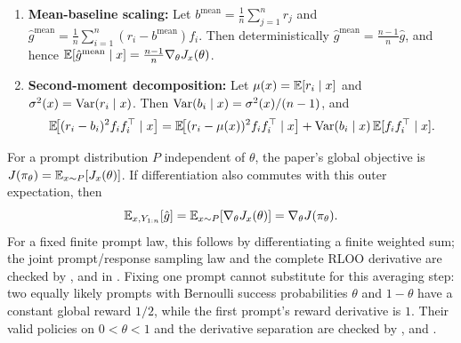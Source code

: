 \begin{remark}
\begin{enumerate}
    $\Cov(f_i, b_i\mid x) = 0$. The moment assumptions ensure that these products and covariances are well-defined.
    \item \textbf{Mean-baseline scaling:} Let $b^{\mathrm{mean}} = \frac{1}{n}\sum_{j=1}^{n} r_j$ and
    $\hat{g}^{\mathrm{mean}} = \frac{1}{n}\sum_{i=1}^{n}(r_i - b^{\mathrm{mean}}) f_i$. Then deterministically
    $\hat{g}^{\mathrm{mean}} = \frac{n-1}{n}\hat{g}$, and hence $\mathbb{E}[\hat{g}^{\mathrm{mean}}\mid x] = \frac{n-1}{n}\nabla_\theta J_x(\theta)$.
    \item \textbf{Second-moment decomposition:} Let $\mu(x) = \mathbb{E}[r_i \mid x]$ and $\sigma^2(x) = \mathrm{Var}(r_i \mid x)$. Then
    $\mathrm{Var}(b_i \mid x) = \sigma^2(x)/(n-1)$, and
	    \begin{equation*}
	        \mathbb{E}\!\big[(r_i - b_i)^2 f_i f_i^\top \mid x\big]
	        = \mathbb{E}\!\big[(r_i - \mu(x))^2 f_i f_i^\top \mid x\big] + \mathrm{Var}(b_i \mid x)\, \mathbb{E}[f_i f_i^\top \mid x].
	    \end{equation*}
\end{enumerate}
\end{remark}

For a prompt distribution $P$ independent of $\theta$, the paper's global
objective is $J(\pi_{\theta})=\mathbb E_{x\sim P}[J_x(\theta)]$.
If differentiation also commutes with this outer expectation, then
\begin{equation*}
 \mathbb E_{x,Y_{1:n}}[\hat g]
 =\mathbb E_{x\sim P}[\nabla_\theta J_x(\theta)]
 =\nabla_\theta J(\pi_{\theta}).
\end{equation*}
For a fixed finite prompt law, this follows by differentiating a finite
weighted sum; the joint prompt/response sampling law and the complete RLOO
derivative are checked by ,
 and
 in .
Fixing one prompt cannot substitute for this averaging step: two equally
likely prompts with Bernoulli success probabilities $\theta$ and $1-\theta$
have a constant global reward $1/2$, while the first prompt's reward
derivative is $1$. Their valid policies on $0<\theta<1$ and the derivative
separation are checked by ,
 and .

